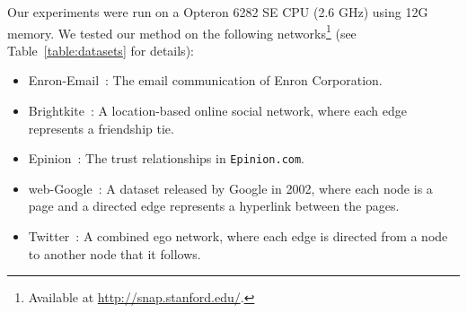 Our experiments were run on a Opteron 6282 SE CPU (2.6 GHz) using 12G memory. We tested our method on the following networks\footnote{Available at \url{http://snap.stanford.edu/}.} (see Table~\ref{table:datasets} for details): 
\begin{itemize}
 \item Enron-Email~\cite{klimt2004introducing}: The email communication of Enron Corporation.
 \item Brightkite~\cite{ChoML11}: A location-based online social network, where each edge represents a friendship tie.
 \item Epinion~\cite{richardson2003trust}: The trust relationships in \texttt{Epinion.com}.
 \item web-Google~\cite{webgoogle}: A dataset released by Google in 2002, where each node is a page and a directed edge represents a hyperlink between the pages.
 \item Twitter~\cite{McAuleyL12}: A combined ego network, where each edge is directed from a node to another node that it follows. 
\end{itemize}



